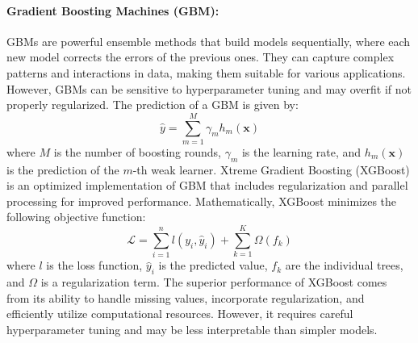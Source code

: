 \documentclass[12pt, a4paper]{article}
\begin{document}
\paragraph{Gradient Boosting Machines (GBM)\cite{friedman2001greedy}:} GBMs are powerful ensemble methods that build models sequentially, where each new model corrects the errors of the previous ones. They can capture complex patterns and interactions in data, making them suitable for various applications. However, GBMs can be sensitive to hyperparameter tuning and may overfit if not properly regularized. The prediction of a GBM is given by:
\begin{equation}
\hat{y} = \sum_{m=1}^{M} \gamma_m h_m(\mathbf{x})
\end{equation}
where $M$ is the number of boosting rounds, $\gamma_m$ is the learning rate, and $h_m(\mathbf{x})$ is the prediction of the $m$-th weak learner. Xtreme Gradient Boosting (XGBoost) \cite{chen2016xgboost} is an optimized implementation of GBM that includes regularization and parallel processing for improved performance. Mathematically, XGBoost minimizes the following objective function:
\begin{equation}
\mathcal{L} = \sum_{i=1}^{n} l(y_i, \hat{y}_i) + \sum_{k=1}^{K} \Omega(f_k)
\end{equation}
where $l$ is the loss function, $\hat{y}_i$ is the predicted value, $f_k$ are the individual trees, and $\Omega$ is a regularization term. The superior performance of XGBoost comes from its ability to handle missing values, incorporate regularization, and efficiently utilize computational resources. However, it requires careful hyperparameter tuning and may be less interpretable than simpler models. 
\end{document}
